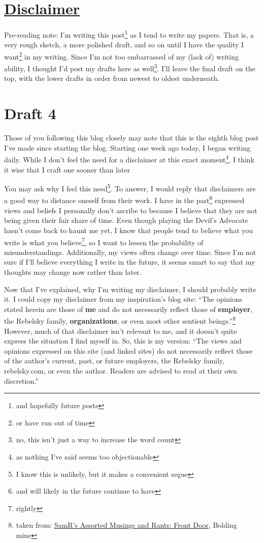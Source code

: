 \documentclass[12pt]{article}[titlepage]
\newcommand{\say}[1]{``#1''}
\newcommand{\1}{\={a}}
\newcommand{\2}{\={e}}
\newcommand{\3}{\={\i}}
\newcommand{\4}{\=o}
\newcommand{\5}{\=u}
\newcommand{\6}{\={A}}
\renewcommand{\,}{\textsuperscript{,}}
\begin{document}
\doublespacing

\section{\href{disclaimer.html}{Disclaimer}}
Pre-reading note: I'm writing this post\footnote{and hopefully future posts} as I tend to write my papers.
That is, a very rough sketch, a more polished draft, and so on until I have the quality I want\footnote{or have run out of time} in my writing.
Since I'm not too embarrassed of my (lack of) writing ability, I thought I'd post my drafts here as well\footnote{no, this isn't just a way to increase the word count}.
I'll leave the final draft on the top, with the lower drafts in order from newest to oldest underneath.

\section{Draft 4}
Those of you following this blog closely may note that this is the eighth blog post I've made since starting the blog.
Starting one week ago today, I began writing daily.
While I don't feel the need for a disclaimer at this exact moment\footnote{as nothing I've said seems too objectionable}, I think it wise that I craft one sooner than later

You may ask why I feel this need\footnote{I know this is unlikely, but it makes a convenient segue}.
To answer, I would reply that disclaimers are a good way to distance oneself from their work.
I have in the past\footnote{and will likely in the future continue to have} expressed views and beliefs I personally don't ascribe to because I believe that they are not being given their fair share of time.
Even though playing the Devil's Advocate hasn't come back to haunt me yet, I know that people tend to believe what you write is what you believe\footnote{rightly}, so I want to lessen the probability of misunderstandings.
Additionally, my views often change over time.
Since I'm not sure if I'll believe everything I write in the future, it seems smart to say that my thoughts may change now rather than later.

Now that I've explained, why I'm writing my disclaimer, I should probably write it.
I could copy my disclaimer from my inspiration's blog site: \say{The opinions stated herein are those of \textbf{me} and do not necessarily reflect those of \textbf{employer}, the Rebelsky family, \textbf{organizations}, or even most other sentient beings.}\footnote{taken from: \href{http://www.cs.grinnell.edu/~rebelsky/musings/}{SamR's Assorted Musings and Rants: Front Door}, Bolding mine}
However, much of that disclaimer isn't relevant to me, and it doesn't quite express the situation I find myself in.
So, this is my version: \say{The views and opinions expressed on this site (and linked sites) do not necessarily reflect those of the author's current, past, or future employers, the Rebelsky family, rebelsky.com, or even the author.
Readers are advised to read at their own discretion.}
\end{document}
